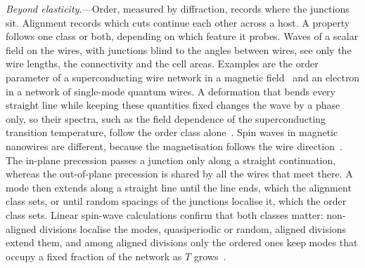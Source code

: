 \documentclass[aps,prl,twocolumn,superscriptaddress,amsmath,amssymb,floatfix]{revtex4-2}
\begin{document}
\textit{Beyond elasticity.}---Order, measured by diffraction, records where the junctions sit.
Alignment records which cuts continue each other across a host. A property follows one class or both, depending on which feature it probes.
Waves of a scalar field on the wires, with junctions blind to the angles between wires, see only
the wire lengths, the connectivity and the cell areas. Examples are the order parameter of a
superconducting wire network in a magnetic field~\cite{degennes1981,alexander1983} and an
electron in a network of single-mode quantum wires. A deformation that bends every straight line
while keeping these quantities fixed changes the wave by a phase only, so their spectra, such as
the field dependence of the superconducting transition temperature, follow the order class
alone~\cite{supp}. Spin waves in magnetic nanowires are different, because the magnetisation
follows the wire direction~\cite{gaididei2014}. The in-plane precession passes a junction only
along a straight continuation, whereas the out-of-plane precession is shared by all the wires
that meet there. A mode then extends along a straight line until the line ends, which the
alignment class sets, or until random spacings of the junctions localise it, which the order
class sets. Linear spin-wave calculations confirm that both classes matter: non-aligned
divisions localise the modes, quasiperiodic or random, aligned divisions extend them, and among
aligned divisions only the ordered ones keep modes that occupy a fixed fraction of the network
as $T$ grows~\cite{supp}.
\end{document}
